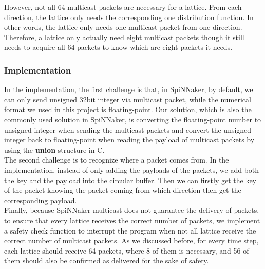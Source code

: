 However, not all 64 multicast packets are necessary for a lattice. From each direction, the lattice only needs the corresponding one distribution function. In other words, the lattice only needs one multicast packet from one direction. Therefore, a lattice only actually need eight multicast packets though it still needs to acquire all 64 packets to know which are eight packets it needs.\\

\subsubsection{Implementation}
In the implementation, the first challenge is that, in SpiNNaker, by default, we can only send unsigned 32bit integer via multicast packet, while the numerical format we used in this project is floating-point. Our solution, which is also the commonly used solution in SpiNNaker, is converting the floating-point number to unsigned integer when sending the multicast packets and convert the unsigned integer back to floating-point when reading the payload of multicast packets by using the \textbf{union} structure in C.\\

The second challenge is to recognize where a packet comes from. In the implementation, instead of only adding the payloads of the packets, we add both the key and the payload into the circular buffer. Then we can firstly get the key of the packet knowing the packet coming from which direction then get the corresponding payload.\\

Finally, because SpiNNaker multicast does not guarantee the delivery of packets, to ensure that every lattice receives the correct number of packets, we implement a safety check function to interrupt the program when not all lattice receive the correct number of multicast packets. As we discussed before, for every time step, each lattice should receive 64 packets, where 8 of them is necessary, and 56 of them should also be confirmed as delivered for the sake of safety.\\

